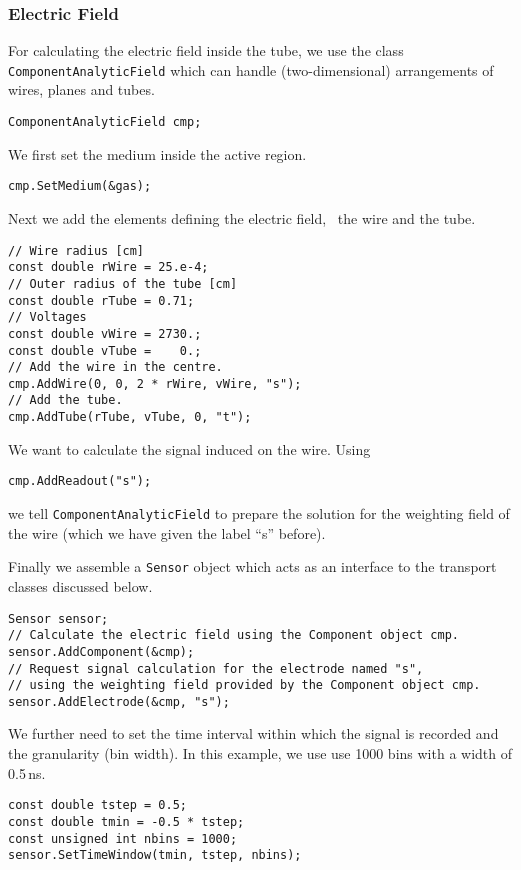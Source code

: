 \subsubsection{Electric Field}
For calculating the electric field inside the tube, 
we use the class \texttt{ComponentAnalyticField} which can handle 
(two-dimensional) arrangements of wires, planes and tubes.
\begin{lstlisting}
ComponentAnalyticField cmp;
\end{lstlisting}
We first set the medium inside the active region. 
\begin{lstlisting}
cmp.SetMedium(&gas); 
\end{lstlisting}
Next we add the elements defining the electric field, 
\ie~the wire and the tube.
\begin{lstlisting}
// Wire radius [cm]
const double rWire = 25.e-4;
// Outer radius of the tube [cm]
const double rTube = 0.71;
// Voltages
const double vWire = 2730.;
const double vTube =    0.;
// Add the wire in the centre.
cmp.AddWire(0, 0, 2 * rWire, vWire, "s");
// Add the tube.
cmp.AddTube(rTube, vTube, 0, "t");
\end{lstlisting}
We want to calculate the signal induced on the wire. 
Using 
\begin{lstlisting}
cmp.AddReadout("s");
\end{lstlisting}
we tell \texttt{ComponentAnalyticField} to prepare the solution for the 
weighting field of the wire (which we have given the label ``s'' before).
 
Finally we assemble a \texttt{Sensor} object which acts as an 
interface to the transport classes discussed below.
\begin{lstlisting}
Sensor sensor;
// Calculate the electric field using the Component object cmp.
sensor.AddComponent(&cmp);
// Request signal calculation for the electrode named "s", 
// using the weighting field provided by the Component object cmp.
sensor.AddElectrode(&cmp, "s"); 
\end{lstlisting}
We further need to set the time interval within which the
signal is recorded and the granularity (bin width). 
In this example, we use use 1000 bins with a width of 0.5\,ns.
\begin{lstlisting}
const double tstep = 0.5;
const double tmin = -0.5 * tstep;
const unsigned int nbins = 1000;
sensor.SetTimeWindow(tmin, tstep, nbins);
\end{lstlisting}

